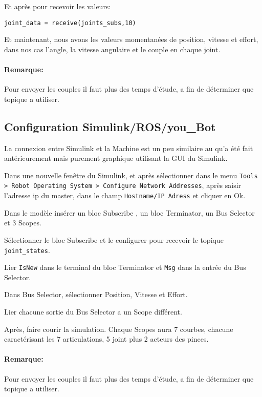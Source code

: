 Et après pour recevoir les valeurs:

\begin{verbatim}
joint_data = receive(joints_subs,10)
\end{verbatim} 

Et maintenant, nous avons les valeurs momentanées de position, vitesse et effort, dans nos cas l'angle, la vitesse angulaire et le couple en chaque joint.

\paragraph{Remarque:} Pour envoyer les couples il faut plus des temps d'étude, a fin de déterminer que topique a utiliser.

\subsection{Configuration Simulink/ROS/you\_Bot}

La connexion entre Simulink et la Machine est un peu similaire au qu'a été fait antérieurement mais purement graphique utilisant la \flqq{}GUI\frqq{} du Simulink.

Dans une nouvelle fenêtre du Simulink, et après sélectionner dans le menu \verb|Tools > Robot Operating System > Configure Network Addresses|, après saisir l'adresse ip du master, dans le champ \verb|Hostname/IP Adress| et cliquer en Ok.
 
Dans le modèle insérer un bloc \flqq{}Subscribe\frqq{}  , un bloc \flqq{}Terminator\frqq{}, un \flqq{}Bus Selector\frqq{} et 3 \flqq{}Scopes\frqq{}. 
 
Sélectionner le bloc \flqq{}Subscribe\frqq{} et le configurer pour recevoir le topique \verb|joint_states|.

Lier \verb|IsNew| dans le  terminal du bloc \flqq{}Terminator\frqq{} et \verb|Msg| dans la entrée du \flqq{}Bus Selector\frqq{}.

Dans \flqq{}Bus Selector\frqq{}, sélectionner Position, Vitesse et Effort.

Lier chacune sortie du \flqq{}Bus Selector\frqq{} a un \flqq{}Scope\frqq{} différent.

Après, faire courir la simulation. Chaque \flqq{}Scopes\frqq{} aura 7 courbes, chacune caractérisant les 7 articulations, 5 joint plus 2 acteurs des pinces.

\paragraph{Remarque:} Pour envoyer les couples il faut plus des temps d'étude, a fin de déterminer que topique a utiliser.